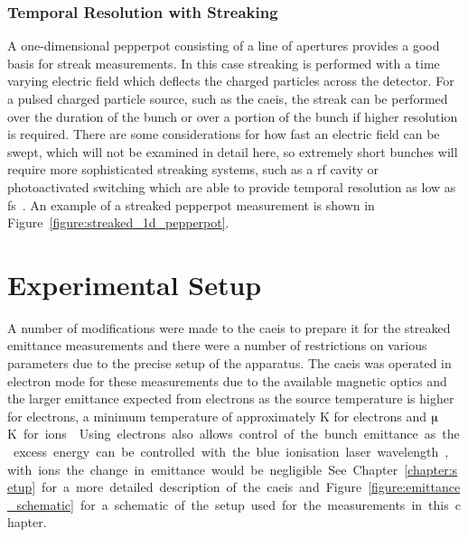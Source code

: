 \subsubsection{Temporal Resolution with Streaking}
A one-dimensional pepperpot consisting of a line of apertures provides a good basis for streak measurements.
In this case streaking is performed with a time varying electric field which deflects the charged particles across the detector.
For a pulsed charged particle source, such as the \gls{caeis}, the streak can be performed over the duration of the bunch or over a portion of the bunch if higher resolution is required.
There are some considerations for how fast an electric field can be swept, which will not be examined in detail here, so extremely short bunches will require more sophisticated streaking systems, such as a \gls{rf} cavity or photoactivated switching which are able to provide temporal resolution as low as \unit[100]{fs}~\cite{li_note:_2010,kassier_compact_2010,van_rens_theory_2018}.
An example of a streaked pepperpot measurement is shown in Figure~\ref{figure:streaked_1d_pepperpot}.

\section{Experimental Setup}

A number of modifications were made to the \gls{caeis} to prepare it for the streaked emittance measurements and there were a number of restrictions on various parameters due to the precise setup of the apparatus.
The \gls{caeis} was operated in electron mode for these measurements due to the available magnetic optics and the larger emittance expected from electrons as the source temperature is higher for electrons, a minimum temperature of approximately \unit[10]{K} for electrons and \unit[100]{$\muup$K} for ions~\cite{saliba_spatial_2012}.
Using electrons also allows control of the bunch emittance as the excess energy can be controlled with the blue ionisation laser wavelength, with ions the change in emittance would be negligible.

See Chapter~\ref{chapter:setup} for a more detailed description of the \gls{caeis} and Figure~\ref{figure:emittance_schematic} for a schematic of the setup used for the measurements in this chapter.


